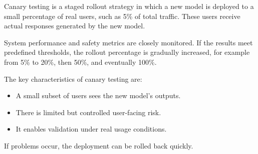 \documentclass[a4paper]{article}
\title{}
\date{}
\begin{document}
    \maketitle
    Canary testing is a staged rollout strategy in which a new model is deployed to a small percentage of real users, such as 5\% of total traffic. These users receive actual responses generated by the new model.
    
    System performance and safety metrics are closely monitored. If the results meet predefined thresholds, the rollout percentage is gradually increased, for example from 5\% to 20\%, then 50\%, and eventually 100\%.
    
    The key characteristics of canary testing are:
    
    \begin{itemize}
        \item A small subset of users sees the new model’s outputs.
        \item There is limited but controlled user-facing risk.
        \item It enables validation under real usage conditions.
    \end{itemize}
    
    If problems occur, the deployment can be rolled back quickly.
\end{document}
